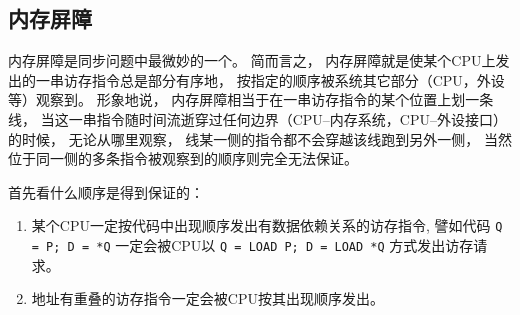 \documentclass[11pt]{article}
\begin{document}
\subsection{内存屏障}
内存屏障是同步问题中最微妙的一个。
简而言之，
内存屏障就是使某个CPU上发出的一串访存指令总是部分有序地，
按指定的顺序被系统其它部分（CPU，外设等）观察到。
形象地说，
内存屏障相当于在一串访存指令的某个位置上划一条线，
当这一串指令随时间流逝穿过任何边界（CPU--内存系统，CPU--外设接口）的时候，
无论从哪里观察，
线某一侧的指令都不会穿越该线跑到另外一侧，
当然位于同一侧的多条指令被观察到的顺序则完全无法保证。

首先看什么顺序是得到保证的：
\begin{enumerate}
  \item 某个CPU一定按代码中出现顺序发出有数据依赖关系的访存指令,
    譬如代码
    \verb|Q = P; D = *Q|
    一定会被CPU以
    \verb|Q = LOAD P; D = LOAD *Q|
    方式发出访存请求。

  \item 地址有重叠的访存指令一定会被CPU按其出现顺序发出。
\end{enumerate}
\end{document}
